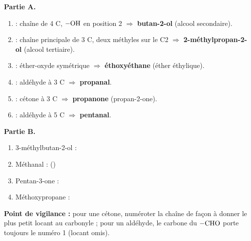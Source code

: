 \documentclass[11pt]{article}
\begin{document}
\begin{corrige}
\textbf{Partie A.}
\begin{enumerate}
\item {} : chaîne de 4 C, $-\ce{OH}$ en position 2 $\Rightarrow$ \textbf{butan-2-ol} (alcool secondaire).
\item {} : chaîne principale de 3 C, deux méthyles sur le C2 $\Rightarrow$ \textbf{2-méthylpropan-2-ol} (alcool tertiaire).
\item {} : éther-oxyde symétrique $\Rightarrow$ \textbf{éthoxyéthane} (éther éthylique).
\item {} : aldéhyde à 3 C $\Rightarrow$ \textbf{propanal}.
\item {} : cétone à 3 C $\Rightarrow$ \textbf{propanone} (propan-2-one).
\item {} : aldéhyde à 5 C $\Rightarrow$ \textbf{pentanal}.
\end{enumerate}
\textbf{Partie B.}
\begin{enumerate}
\item 3-méthylbutan-2-ol : 
\item Méthanal :  \quad ()
\item Pentan-3-one : 
\item Méthoxypropane : 
\end{enumerate}
\textbf{Point de vigilance :} pour une cétone, numéroter la chaîne de façon à donner le plus petit locant au carbonyle ; pour un aldéhyde, le carbone du $-\ce{CHO}$ porte toujours le numéro 1 (locant omis).
\end{corrige}
\end{document}
